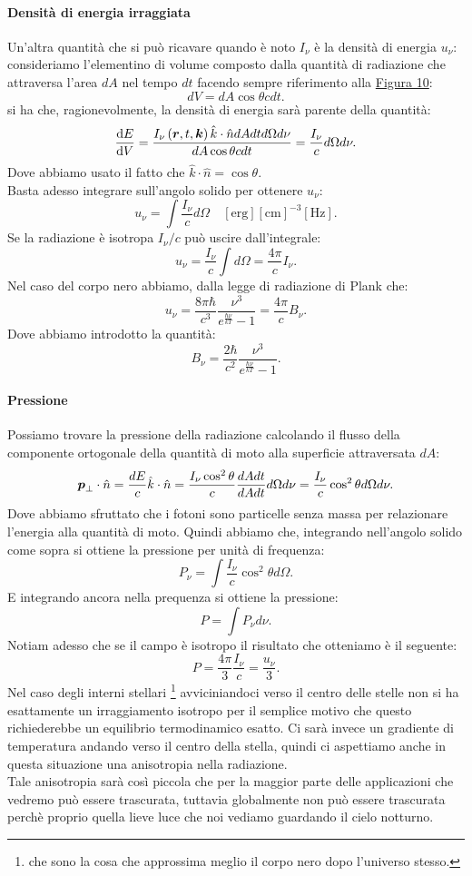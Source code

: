 \paragraph{Densità di energia irraggiata}%
Un'altra quantità che si può ricavare quando è noto $I_{\nu}$ è la densità di energia $u_{\nu}$:
consideriamo l'elementino di volume composto dalla quantità di radiazione che attraversa l'area $dA$ nel tempo $dt$ facendo sempre riferimento alla \hyperref[fig:figura-per-introdurre-lintensit-specifica]{Figura 10}:
\[
	dV = dA \cos\theta c dt 
.\] 
si ha che, ragionevolmente, la densità di energia sarà parente della quantità:
\[
	\frac{\mbox{d} E}{\mbox{d} V} = \frac{I_{\nu}\left( \boldsymbol{r}, t, \boldsymbol{k} \right)  \hat{k} \cdot \hat{n} dA dt d\Omega d\nu}{dA \cos\theta c dt} = \frac{I_{\nu}}{c}d\Omega d\nu
.\] 
Dove abbiamo usato il fatto che $\hat{k}\cdot \hat{n} =\cos\theta$.\\
Basta adesso integrare sull'angolo solido per ottenere $u_{\nu}$:
\[
	u_{\nu} = \int \frac{I_{\nu}}{c}d\Omega \quad \left[ \text{erg} \right] \left[ \text{cm} \right]^{-3} \left[ \text{Hz} \right]
.\] 
Se la radiazione è isotropa $I_{\nu} /c$ può uscire dall'integrale:
\[
	u_{\nu} = \frac{I_{\nu}}{c} \int d\Omega = \frac{4\pi}{c} I_{\nu} 
.\]
Nel caso del corpo nero abbiamo, dalla legge di radiazione di Plank che:
\[
	u_{\nu} = \frac{8\pi\hbar}{c^3} \frac{\nu^3}{e^{\frac{\hbar \nu}{kT}}-1}= \frac{4\pi}{c} B_{\nu}
.\] 
Dove abbiamo introdotto la quantità:
\[
	B_{\nu}= \frac{2 \hbar}{c^2} \frac{\nu^3}{e^{\frac{\hbar \nu}{kT}}-1}
.\] 
\paragraph{Pressione}%
Possiamo trovare la pressione della radiazione calcolando il flusso della componente ortogonale della quantità di moto alla superficie attraversata $dA$:
\[
	\boldsymbol{p}_{\bot} \cdot \hat{n}=\frac{dE}{c}\hat{k}\cdot \hat{n}= \frac{I_{\nu} \cos^2\theta}{c} \frac{dA dt}{dA dt} d\Omega d\nu = \frac{I_{\nu}}{c}\cos^2\theta d\Omega d\nu
.\] 
Dove abbiamo sfruttato che i fotoni sono particelle senza massa per relazionare l'energia alla quantità di moto.
Quindi abbiamo che, integrando nell'angolo solido come sopra si ottiene la pressione per unità di frequenza: 
\[
	P_{\nu} = \int \frac{I_{\nu}}{c} \cos^2\theta d\Omega 
.\] 
E integrando ancora nella prequenza si ottiene la pressione:
\[
	P = \int P_{\nu}d\nu 
.\] 
Notiam adesso che se il campo è isotropo il risultato che otteniamo è il seguente:
\[
	 P = \frac{4\pi}{3}\frac{I_{\nu}}{c} = \frac{u_{\nu}}{3}
.\] 
Nel caso degli interni stellari \footnote{che sono la cosa che approssima meglio il corpo nero dopo l'universo stesso.} avviciniandoci verso il centro delle stelle non si ha esattamente un irraggiamento isotropo per il semplice motivo che questo richiederebbe un equilibrio termodinamico esatto. Ci sarà invece un gradiente di temperatura andando verso il centro della stella, quindi ci aspettiamo anche in questa situazione una anisotropia nella radiazione.\\
Tale anisotropia sarà così piccola che per la maggior parte delle applicazioni che vedremo può essere trascurata, tuttavia globalmente non può essere trascurata perchè proprio quella lieve luce che noi vediamo guardando il cielo notturno.

